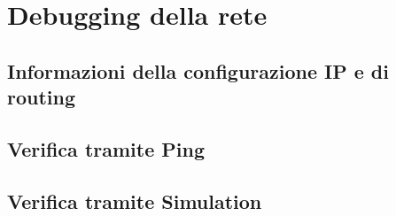 \section{Debugging della rete}
\subsection{Informazioni della configurazione IP e di routing}
\subsection{Verifica tramite Ping}
\subsection{Verifica tramite Simulation}
